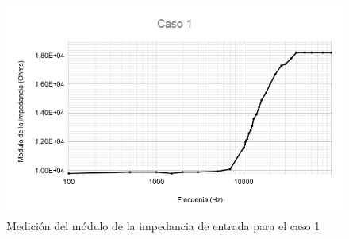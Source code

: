 \begin{figure}[H]
\begin{centering}
\includegraphics[scale=0.5]{../Ex1/iA/Resources1a/zinpm1_med}
\par\end{centering}
\caption{Medición del módulo de la impedancia de entrada para el caso 1}

\end{figure}

